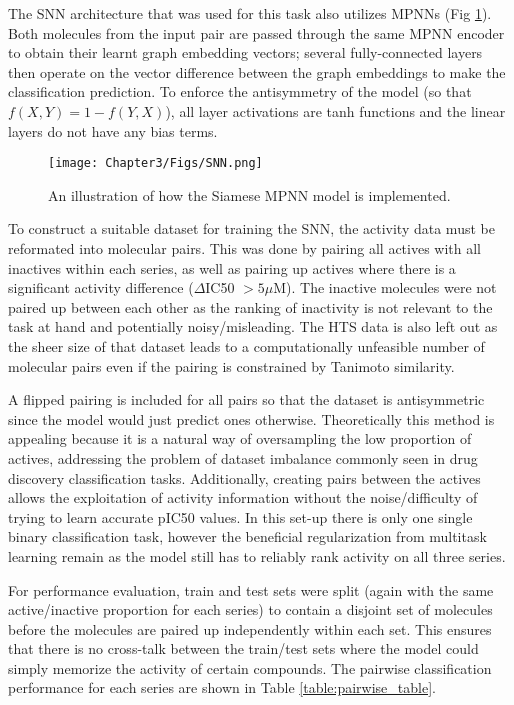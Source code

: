 The SNN architecture that was used for this task also utilizes MPNNs (Fig \ref{fig:snn}). Both molecules from the input pair are passed through the same MPNN encoder to obtain their learnt graph embedding vectors; several fully-connected layers then operate on the vector difference between the graph embeddings to make the classification prediction. To enforce the antisymmetry of the model (so that $f(X,Y) = 1 - f(Y,X)$), all layer activations are tanh functions and the linear layers do not have any bias terms.
\begin{figure}[!h] %
\centering
\texttt{[image: Chapter3/Figs/SNN.png]}
\caption{\label{fig:snn} An illustration of how the Siamese MPNN model is implemented.}
\end{figure}

To construct a suitable dataset for training the SNN, the activity data must be reformated into molecular pairs. This was done by pairing all actives with all inactives within each series, as well as pairing up actives where there is a significant activity difference ($\Delta$IC50 $>5\mu$M). The inactive molecules were not paired up between each other as the ranking of inactivity is not relevant to the task at hand and potentially noisy/misleading. The HTS data is also left out as the sheer size of that dataset leads to a computationally unfeasible number of molecular pairs even if the pairing is constrained by Tanimoto similarity. 

A flipped pairing is included for all pairs so that the dataset is antisymmetric since the model would just predict ones otherwise. Theoretically this method is appealing because it is a natural way of oversampling the low proportion of actives, addressing the problem of dataset imbalance commonly seen in drug discovery classification tasks. Additionally, creating pairs between the actives allows the exploitation of activity information without the noise/difficulty of trying to learn accurate pIC50 values. In this set-up there is only one single binary classification task, however the beneficial regularization from multitask learning remain as the model still has to reliably rank activity on all three series.

For performance evaluation, train and test sets were split (again with the same active/inactive proportion for each series) to contain a disjoint set of molecules before the molecules are paired up independently within each set. This ensures that there is no cross-talk between the train/test sets where the model could simply memorize the activity of certain compounds. The pairwise classification performance for each series are shown in Table \ref{table:pairwise_table}.

